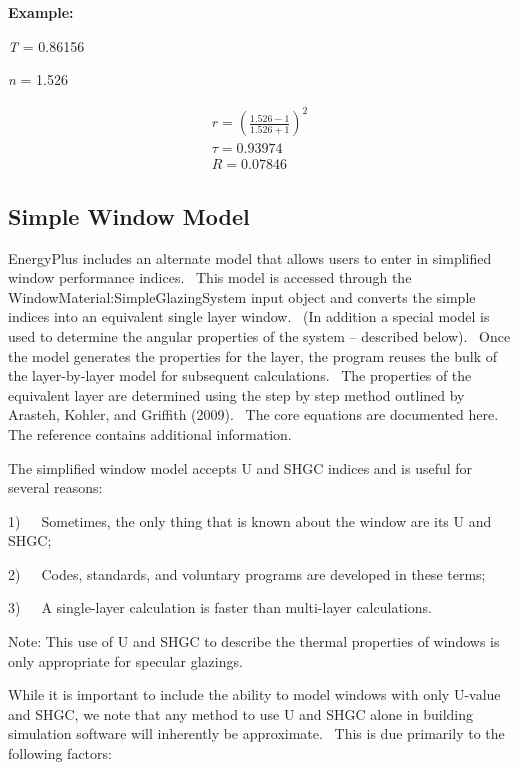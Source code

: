 \textbf{Example:}

\emph{T} = 0.86156

\emph{n} = 1.526

\begin{equation}
  \begin{array}{l}
    r = \left( \frac{1.526 - 1}{1.526 + 1} \right)^2 \\
    \tau = 0.93974 \\
    R = 0.07846
  \end{array}
\end{equation}

\subsection{Simple Window Model}\label{simple-window-model}

EnergyPlus includes an alternate model that allows users to enter in simplified window performance indices.~ This model is accessed through the WindowMaterial:SimpleGlazingSystem input object and converts the simple indices into an equivalent single layer window.~ (In addition a special model is used to determine the angular properties of the system -- described below).~ Once the model generates the properties for the layer, the program reuses the bulk of the layer-by-layer model for subsequent calculations.~ The properties of the equivalent layer are determined using the step by step method outlined by Arasteh, Kohler, and Griffith (2009).~ The core equations are documented here.~ The reference contains additional information.

The simplified window model accepts U and SHGC indices and is useful for several reasons:

1)~~~Sometimes, the only thing that is known about the window are its U and SHGC;

2)~~~Codes, standards, and voluntary programs are developed in these terms;

3)~~~A single-layer calculation is faster than multi-layer calculations.

Note: This use of U and SHGC to describe the thermal properties of windows is only appropriate for specular glazings.

While it is important to include the ability to model windows with only U-value and SHGC, we note that any method to use U and SHGC alone in building simulation software will inherently be approximate.~ This is due primarily to the following factors:

